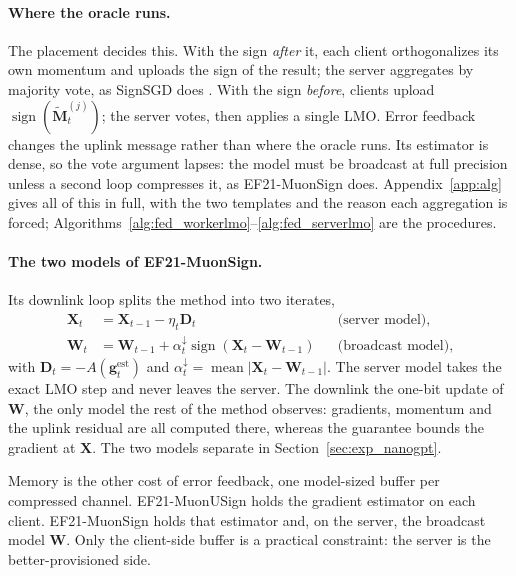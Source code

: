 \paragraph{Where the oracle runs.} The placement decides this. With the sign \emph{after} it, each client orthogonalizes its own momentum and uploads the sign of the result; the server aggregates by majority vote, as SignSGD does \citep{bernstein2019signsgdmajority}. With the sign \emph{before}, clients upload $\operatorname{sign}(\tilde{\mathbf{M}}_t^{(j)})$; the server votes, then applies a single LMO. Error feedback changes the uplink message rather than where the oracle runs. Its estimator is dense, so the vote argument lapses: the model must be broadcast at full precision unless a second loop compresses it, as EF21-MuonSign does.  Appendix~\ref{app:alg} gives all of this in full, with the two templates and the reason each aggregation is forced; Algorithms~\ref{alg:fed_workerlmo}--\ref{alg:fed_serverlmo} are the procedures.

\paragraph{The two models of EF21-MuonSign.} Its downlink loop splits the method into two iterates,
\begin{equation}\label{eq:two_models}
\begin{aligned}
  \mathbf{X}_{t}&=\mathbf{X}_{t-1}-\eta_t\mathbf{D}_t &&\text{(server model)},\\
  \mathbf{W}_{t}&=\mathbf{W}_{t-1}+\alpha_t^{\downarrow}\operatorname{sign}(\mathbf{X}_{t}-\mathbf{W}_{t-1}) &&\text{(broadcast model)},
\end{aligned}
\end{equation}
with $\mathbf{D}_t=-A(\mathbf{g}_{t}^{\mathrm{est}})$ and $\alpha_t^{\downarrow}=\operatorname{mean}|\mathbf{X}_t-\mathbf{W}_{t-1}|$. The server model takes the exact LMO step and never leaves the server. The downlink  the one-bit update of $\mathbf{W}$, the only model the rest of the method observes: gradients, momentum and the uplink residual are all computed there, whereas the guarantee bounds the gradient at $\mathbf{X}$. The two models separate in Section~\ref{sec:exp_nanogpt}.

Memory is the other cost of error feedback, one model-sized buffer per compressed channel. EF21-MuonUSign holds the gradient estimator on each client. EF21-MuonSign holds that estimator and, on the server, the broadcast model $\mathbf{W}$. Only the client-side buffer is a practical constraint: the server is the better-provisioned side.


